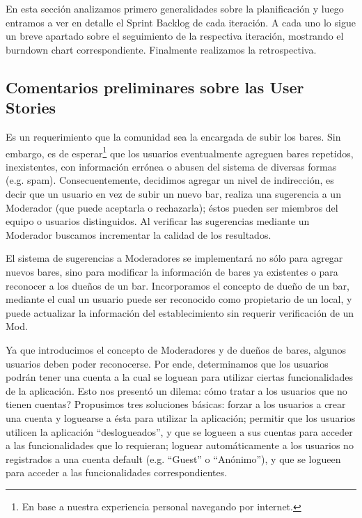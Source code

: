 En esta sección analizamos primero generalidades sobre la planificación y luego entramos a ver en detalle el Sprint Backlog de cada iteración. A cada uno lo sigue un breve apartado sobre el seguimiento de la respectiva iteración, mostrando el burndown chart correspondiente. Finalmente realizamos la retrospectiva. 

\subsection{Comentarios preliminares sobre las User Stories}
\par Es un requerimiento que la comunidad sea la encargada de subir los bares. 
Sin embargo, es de esperar\footnote{En base a nuestra experiencia personal navegando por internet.} que los usuarios eventualmente agreguen bares repetidos, inexistentes, con información errónea o abusen del sistema de diversas formas (e.g. spam).
Consecuentemente, decidimos agregar un nivel de indirección, es decir que un usuario en vez de subir un nuevo bar, realiza una sugerencia a un Moderador (que puede aceptarla o rechazarla); éstos pueden ser miembros del equipo o usuarios distinguidos. 
Al verificar las sugerencias mediante un Moderador buscamos incrementar la calidad de los resultados.

\par El sistema de sugerencias a Moderadores se implementará no sólo para agregar nuevos bares, sino para modificar la información de bares ya existentes o para reconocer a los dueños de un bar.
Incorporamos el concepto de dueño de un bar, mediante el cual un usuario puede ser reconocido como propietario de un local, y puede actualizar la información del establecimiento sin requerir verificación de un Mod.

\par Ya que introducimos el concepto de Moderadores y de dueños de bares, algunos usuarios deben poder reconocerse.
Por ende, determinamos que los usuarios podrán tener una cuenta a la cual se loguean para utilizar ciertas funcionalidades de la aplicación.
Esto nos presentó un dilema: cómo tratar a los usuarios que no tienen cuentas?
Propusimos tres soluciones básicas: forzar a los usuarios a crear una cuenta y loguearse a ésta para utilizar la aplicación; permitir que los usuarios utilicen la aplicación ``deslogueados'', y que se logueen a sus cuentas para acceder a las funcionalidades que lo requieran; loguear automáticamente a los usuarios no registrados a una cuenta default (e.g. ``Guest'' o ``Anónimo''), y que se logueen para acceder a las funcionalidades correspondientes.

